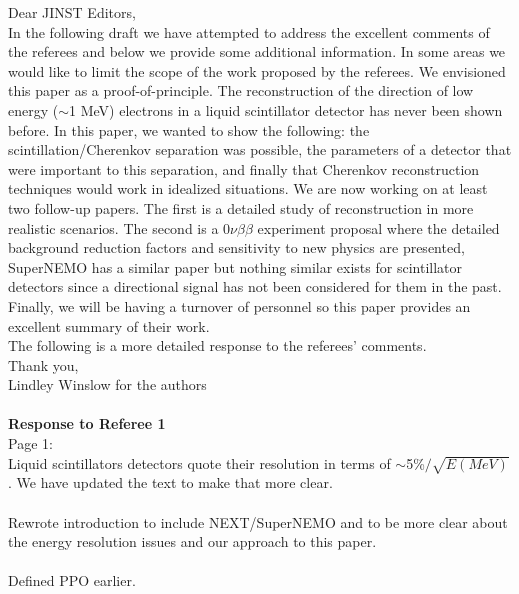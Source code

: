 \documentclass[11pt]{article}
\begin{document}
 
\noindent
Dear JINST Editors, \\

In the following draft we have attempted to address the excellent comments of the referees and below we provide some additional information. In some areas we would like to limit the scope of the work proposed by the referees. We envisioned this paper as a proof-of-principle. The reconstruction of the direction of low energy ($\sim$1 MeV) electrons in a liquid scintillator detector has never been shown before. In this paper, we wanted to show the following: the scintillation/Cherenkov separation was possible, the parameters of a detector that were important to this separation, and finally that Cherenkov reconstruction techniques would work in idealized situations. We are now working on at least two follow-up papers. The first is a detailed study of  reconstruction in more realistic scenarios. The second is a $0\nu\beta\beta$  experiment proposal where the detailed background reduction factors and sensitivity to new physics are presented, SuperNEMO has a similar paper but nothing similar exists for scintillator detectors since a directional signal has not been considered for them in the past.  Finally, we will be having a turnover of personnel so this paper provides an excellent summary of their work.\\ 

\noindent
The following is a more detailed response to the referees' comments.\\ 

\noindent
Thank you,\\ 
Lindley Winslow for the authors
\\
\\
\noindent
{\bf Response to Referee 1}\\
Page 1: \\
Liquid scintillators detectors quote their resolution in terms of  $\sim$5\%$/\sqrt{E(MeV)}$. We have updated the text to make that more clear. \\ \\
Rewrote introduction to include NEXT/SuperNEMO and to be more clear about the energy resolution issues and our approach to this paper. \\ \\
Defined PPO earlier.\\
\end{document}
